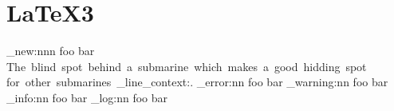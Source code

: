 \section{\LaTeX3}

\ExplSyntaxOn
\msg_new:nnn {foo} {bar} {
  The~blind~spot~behind~a~submarine~which~makes~a~good~hidding~spot~
  for~other~submarines~\msg_line_context:.}
\msg_error:nn {foo} {bar}
\msg_warning:nn {foo} {bar}
\msg_info:nn {foo} {bar}
\msg_log:nn {foo} {bar}
\ExplSyntaxOff
